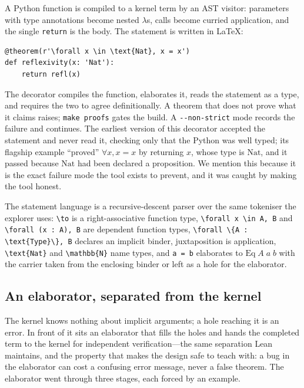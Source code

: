 \documentclass[11pt]{article}
\begin{document}
A Python function is compiled to a kernel term by an AST visitor: parameters
with type annotations become nested $\lambda$s, calls become curried
application, and the single \verb|return| is the body. The statement is written
in \LaTeX{}:
\begin{lstlisting}
@theorem(r'\forall x \in \text{Nat}, x = x')
def reflexivity(x: 'Nat'):
    return refl(x)
\end{lstlisting}
The decorator compiles the function, elaborates it, reads the statement as a
type, and requires the two to agree definitionally. A theorem that does not
prove what it claims raises; \verb|make proofs| gates the build. A
\verb|--non-strict| mode records the failure and continues. The earliest
version of this decorator accepted the statement and never read it, checking
only that the Python was well typed; its flagship example ``proved'' $\forall
x, x = x$ by returning $x$, whose type is $\mathrm{Nat}$, and it passed because
$\mathrm{Nat}$ had been declared a proposition. We mention this because it is
the exact failure mode the tool exists to prevent, and it was caught by making
the tool honest.

The statement language is a recursive-descent parser over the same tokeniser
the explorer uses: \verb|\to| is a right-associative function type,
\verb|\forall x \in A, B| and \verb|\forall (x : A), B| are dependent function
types, \verb|\forall \{A : \text{Type}\}, B| declares an implicit binder,
juxtaposition is application, \verb|\text{Nat}| and \verb|\mathbb{N}| name
types, and \verb|a = b| elaborates to $\mathrm{Eq}\;A\;a\;b$ with the carrier
taken from the enclosing binder or left as a hole for the elaborator.

\subsection{An elaborator, separated from the kernel}

The kernel knows nothing about implicit arguments; a hole reaching it is an
error. In front of it sits an elaborator that fills the holes and hands the
completed term to the kernel for independent verification---the same
separation Lean maintains, and the property that makes the design safe to
teach with: a bug in the elaborator can cost a confusing error message, never a
false theorem. The elaborator went through three stages, each forced by an
example.
\end{document}
